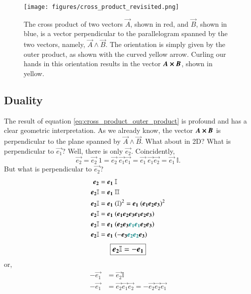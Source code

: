 \begin{figure}[H]
    \centering
    \texttt{[image: figures/cross\_product\_revisited.png]}
    \caption{The cross product of two vectors $\vec{A}$, shown in red, and $\vec{B}$, shown in blue, is a vector perpendicular to the parallelogram spanned by the two vectors, namely, $\vec{A} \wedge \vec{B}$. The orientation is simply given by the outer product, as shown with the curved yellow arrow. Curling our hands in this orientation results in the vector $\vec{A} \cross \vec{B}$, shown in yellow.}
    \label{fig:cross_product_revisited}
\end{figure}



\subsection{Duality} \label{sec:duality}
The result of equation \eqref{eq:cross_product_outer_product} is profound and has a clear geometric interpretation. As we already know, the vector $ \vec{A}  \cross \vec{B}  $ is perpendicular to the plane spanned by $ \vec{A}  \wedge \vec{B} $. What about in 2D? What is perpendicular to $\vec{e_1}$? Well, there is only $\vec{e_2}$. Coincidently, 
$$ \vec{e_2} = \vec{e_2} \ 1 = \vec{e_2}  \ \vec{e_1} \vec{e_1}= \vec{e_1}  \ \vec{e_1} \vec{e_2} = \vec{e_1}  \ \mathbb{I}.$$
But what is perpendicular to $\vec{e_2}$?
\begin{align*}
\vec{e_2} &= \vec{e_1}  \ \mathbb{I} \\
\vec{e_2} \mathbb{I} &= \vec{e_1}  \ \mathbb{I} \mathbb{I} \\
\vec{e_2} \mathbb{I} &= \vec{e_1}  \ (\mathbb{I})^2=  \vec{e_1}  \ (\vec{e_1} \vec{e_2} \vec{e_3})^2 \\
\vec{e_2} \mathbb{I} &=  \vec{e_1}  \ (\vec{e_1} \vec{e_2} \vec{e_3} \vec{e_1} \vec{e_2} \vec{e_3} )\\
\vec{e_2} \mathbb{I} &=  \vec{e_1}  \ (\vec{e_2} \vec{e_3} \color{teal}{\vec{e_1} \vec{e_1}} \color{black} \vec{e_2} \vec{e_3} )\\
\vec{e_2} \mathbb{I} &=  \vec{e_1}  \ (-  \vec{e_3} \color{teal}{\vec{e_2} \vec{e_2}} \color{black} \vec{e_3} )
\end{align*}
\begin{equation} \label{eq:dual_3d_test_1}
\large\boxed{\vec{e_2} \mathbb{I} =  -\vec{e_1}}
\end{equation}
or,
\begin{align*}
 -\vec{e_1} &=  \vec{e_2} \mathbb{I} \\
 -\vec{e_1} &=\vec{e_2} \vec{e_1} \vec{e_2} = - \vec{e_2} \vec{e_2} \vec{e_1}
\end{align*}

